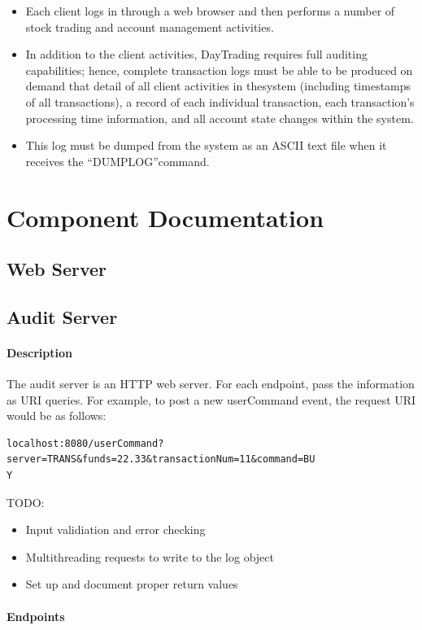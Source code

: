 \documentclass[a4paper,10pt]{article}
\begin{document}
\begin{itemize}
\item Each client logs in through a web browser and then performs a number of 
stock trading and account management activities.
\item In addition to the client activities, DayTrading requires full auditing 
capabilities; hence, complete transaction logs must be able to be produced on 
demand that detail of all client activities in thesystem (including timestamps 
of all transactions), a record of each individual transaction, each 
transaction’s processing time information, and all account state changes within 
the system. 
\item This log must be dumped from the system as an ASCII text file when it 
receives the “DUMPLOG”command.
 
\end{itemize}

\section{Component Documentation}
\subsection{Web Server}
\subsection{Audit Server}
\paragraph{Description}

The audit server is an HTTP web server. For each endpoint, pass the information 
as URI queries. For example, to post a new userCommand event, the request URI 
would be as follows:

\begin{verbatim}
localhost:8080/userCommand?server=TRANS&funds=22.33&transactionNum=11&command=BU 
Y\end{verbatim}

TODO:
\begin{itemize}
 \item Input validiation and error checking
 \item Multithreading requests to write to the log object
 \item Set up and document proper return values
\end{itemize}

\paragraph{Endpoints}
\end{document}
